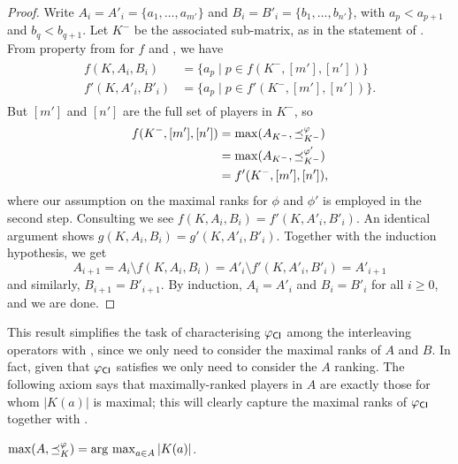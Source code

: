 \begin{proof}
    Write $A_i = A'_i = \{a_1, \ldots, a_{m'}\}$ and $B_i = B'_i =
    \{b_1, \ldots, b_{n'}\}$, with $a_p < a_{p+1}$ and $b_q < b_{q+1}$. Let
    $K^-$ be the associated sub-matrix, as in the statement of \smi{}.
    From property  from
     for $f$ and \smi{}, we have
    \begin{align}
        \label{tourn_eqn_smi_maximal_ranks_equal_f}
        \begin{split}
            f(K, A_i, B_i) &= \{a_p \mid p \in f(K^-, [m'], [n'])\} \\
            f'(K, A'_i, B'_i) &= \{a_p \mid p \in f'(K^-, [m'], [n'])\}.
        \end{split}
    \end{align}
    But $[m']$ and $[n']$ are the full set of players in $K^-$, so
    \begin{align*}
        f(K^-, [m'], [n'])
        &= \max(A_{K^-}, {\preceq_{K^-}^\varphi}) \\
        &= \max(A_{K^-}, {\preceq_{K^-}^{\varphi'}}) \\
        &= f'(K^-, [m'], [n']),
    \end{align*}
    where our assumption on the maximal ranks for $\phi$ and $\phi'$ is
    employed in the second step. Consulting
     we see $f(K, A_i, B_i) =
    f'(K, A'_i, B'_i)$. An identical argument shows $g(K, A_i, B_i) = g'(K,
    A'_i, B'_i)$. Together with the induction hypothesis, we get
    \[
        A_{i + 1}
        = A_i \setminus f(K, A_i, B_i)
        = A'_i \setminus f'(K, A'_i, B'_i)
        = A'_{i + 1}
    \]
    and similarly, $B_{i + 1} = B'_{i + 1}$. By induction, $A_i = A'_i$ and
    $B_i = B'_i$ for all $i \ge 0$, and we are done.
\end{proof}

This result simplifies the task of characterising ${\varphi_{\mathsf{CI}}}$ among the
interleaving operators with \smi{}, since we only need to consider the
maximal ranks of $A$ and $B$. In fact, given that ${\varphi_{\mathsf{CI}}}$ satisfies
\dualaxiom{} we only need to consider the $A$ ranking. The following axiom
says that maximally-ranked players in $A$ are exactly those for whom $|K(a)|$
is maximal; this will clearly capture the maximal ranks of ${\varphi_{\mathsf{CI}}}$
together with \dualaxiom{}.

\begin{axiom}[\argmaxaxiom{}]
    $\max(A, {\preceq_K^\varphi}) = \operatorname*{arg\ max}_{a \in A}{|K(a)|}$.
\end{axiom}

